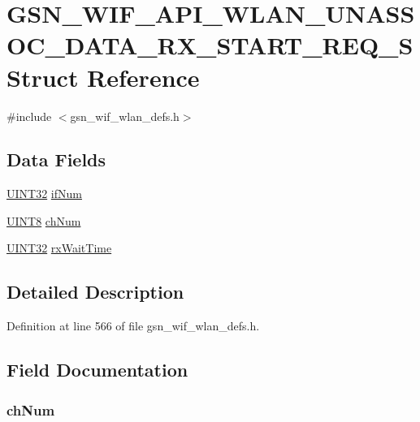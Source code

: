 \hypertarget{a00310}{
\section{GSN\_\-WIF\_\-API\_\-WLAN\_\-UNASSOC\_\-DATA\_\-RX\_\-START\_\-REQ\_\-S Struct Reference}
\label{a00310}
}


{\ttfamily \#include $<$gsn\_\-wif\_\-wlan\_\-defs.h$>$}

\subsection*{Data Fields}
\begin{DoxyCompactItemize}
\item 
\hyperlink{a00660_gae1e6edbbc26d6fbc71a90190d0266018}{UINT32} \hyperlink{a00310_ab582fd779b13f74e06e2491389a60aa0}{ifNum}
\item 
\hyperlink{a00660_gab27e9918b538ce9d8ca692479b375b6a}{UINT8} \hyperlink{a00310_a2418a3fb10f1e2901ed5d265f8dc8e52}{chNum}
\item 
\hyperlink{a00660_gae1e6edbbc26d6fbc71a90190d0266018}{UINT32} \hyperlink{a00310_a5e99b08f817fc8c7382a7f48f61a44bb}{rxWaitTime}
\end{DoxyCompactItemize}


\subsection{Detailed Description}


Definition at line 566 of file gsn\_\-wif\_\-wlan\_\-defs.h.



\subsection{Field Documentation}
\hypertarget{a00310_a2418a3fb10f1e2901ed5d265f8dc8e52}{
\subsubsection[{chNum}]{ {\bf chNum}}}
\label{a00310_a2418a3fb10f1e2901ed5d265f8dc8e52}


